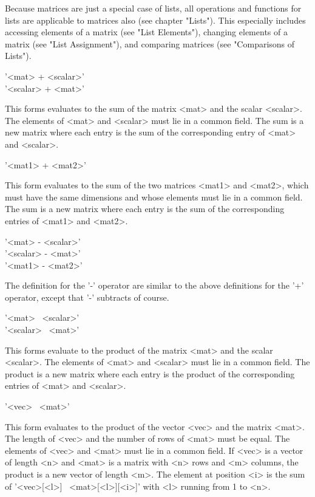 Because  matrices are  just a special  case of lists, all operations  and
functions  for  lists  are  applicable  to  matrices  also  (see  chapter
"Lists").   This especially includes  accessing elements of a matrix (see
"List Elements"), changing elements of  a matrix (see "List Assignment"),
and comparing matrices (see "Comparisons of Lists").


'<mat> + <scalar>' \\
'<scalar> + <mat>'

This  forms evaluates  to  the  sum of  the matrix  <mat> and the  scalar
<scalar>.  The elements of <mat> and <scalar> must lie in a common field.
The sum is a new matrix where each entry is the sum of the  corresponding
entry of <mat> and <scalar>.

'<mat1> + <mat2>'

This  form evaluates to the  sum  of the two matrices <mat1> and  <mat2>,
which  must have  the  same dimensions and whose  elements must lie in  a
common field.  The sum is a new matrix where each entry is the sum of the
corresponding entries of <mat1> and <mat2>.

'<mat> - <scalar>' \\
'<scalar> - <mat>' \\
'<mat1> - <mat2>'

The definition  for the '-' operator are similar to the above definitions
for the '+' operator, except that '-' subtracts of course.

'<mat> \*\ <scalar>' \\
'<scalar> \*\ <mat>'

This forms evaluate  to the product of the matrix  <mat> and  the  scalar
<scalar>.  The elements of <mat> and <scalar> must lie in a common field.
The product  is  a  new matrix  where each entry  is the  product of  the
corresponding entries of <mat> and <scalar>.

'<vec> \*\ <mat>'

This form evaluates to  the product  of  the vector <vec> and  the matrix
<mat>.   The length of <vec>  and  the  number  of rows of <mat> must  be
equal.  The  elements of <vec> and <mat> must lie  in a common field.  If
<vec> is a vector of length <n> and <mat> is  a matrix with <n>  rows and
<m> columns, the product is a new  vector of length <m>.   The element at
position  <i> is  the sum  of  '<vec>[<l>] \*\  <mat>[<l>][<i>]' with <l>
running from 1 to <n>.

